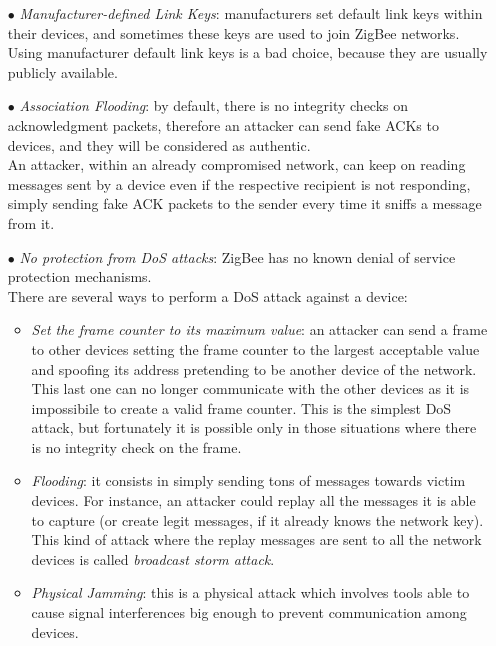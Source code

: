 \documentclass[12pt]{report}
\begin{document}
\begin{itemize}
\item[$\bullet$] \emph{Manufacturer-defined Link Keys}: manufacturers set default link keys within their devices, and sometimes these keys are used to join ZigBee networks.\\
Using manufacturer default link keys is a bad choice, because they are usually publicly available.

\item[$\bullet$] \emph{Association Flooding}: by default, there is no integrity checks on acknowledgment packets, therefore an attacker can send fake ACKs to devices, and they will be considered as authentic.\\
An attacker, within an already compromised network, can keep on reading messages sent by a device even if the respective recipient is not responding, simply sending fake ACK packets to the sender every time it sniffs a message from it. 

\item[$\bullet$] \emph{No protection from DoS attacks}: ZigBee has no known denial of service protection mechanisms.\\
There are several ways to perform a DoS attack against a device:


\begin{itemize}
\setlength{\itemindent}{+4mm}
\item \emph{Set the frame counter to its maximum value}: an attacker can send a frame to other devices setting the frame counter to the largest acceptable value and spoofing its address pretending to be another device of the network.\\
This last one can no longer communicate with the other devices as it is impossibile to create a valid frame counter.
This is the simplest DoS attack, but fortunately it is possible only in those situations where there is no integrity check on the frame.

\item \emph{Flooding}: it consists in simply sending tons of messages towards victim devices. For instance, an attacker could replay all the messages it is able to capture (or create legit messages, if it already knows the network key).\\
This kind of attack where the replay messages are sent to all the network devices is called \emph{broadcast storm attack}.

\item \emph{Physical Jamming}: this is a physical attack which involves tools able to cause signal interferences big enough to prevent communication among devices.


\end{itemize}
\end{itemize}
\end{document}
